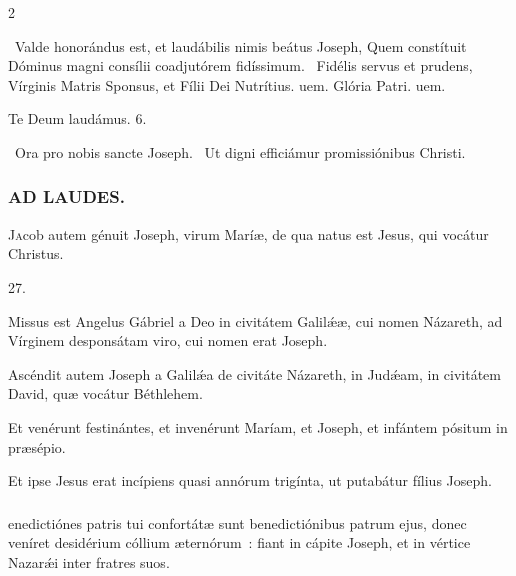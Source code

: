 \documentclass[9pt,twoside]{extarticle}
\begin{document}
\begin{multicols}{2}
{{{\begin{tightlist}{}
\item {}~Valde honorándus est, et laudábilis nimis beátus Joseph, \textred{*} Quem constítuit Dóminus magni consílii coadjutórem fidíssimum. ~Fidélis servus et prudens, Vírginis Matris Sponsus, et Fílii Dei Nutrítius. uem. Glória Patri. uem.
\item Te Deum laudámus. 6.
\item {}~Ora pro nobis sancte Joseph. ~Ut digni efficiámur promissiónibus Christi.
\end{tightlist}

\subsubsection*{\center \textsc{AD LAUDES.}}
\begin{center}\end{center}
\lettrine{J}acob autem génuit Joseph, virum Maríæ, de qua natus est Jesus, qui vocátur Christus.

\begin{tightlist}{}
\item {} 27.
\item {} Missus est Angelus Gábriel a Deo in civitátem Galilǽæ, cui nomen Názareth, ad Vírginem desponsátam viro, cui nomen erat Joseph.
\item {} Ascéndit autem Joseph a Galilǽa de civitáte Názareth, in Judǽam, in civitátem David, quæ vocátur Béthlehem.
\item {} Et venérunt festinántes, et invenérunt Maríam, et Joseph, et infántem pósitum in præsépio.
\item {} Et ipse Jesus erat incípiens quasi annórum trigínta, ut putabátur fílius Joseph.
\end{tightlist}

\subsubsection*{}
enedictiónes patris tui confortátæ sunt benedictiónibus patrum ejus, donec veníret desidérium cóllium æternórum~: fiant in cápite Joseph, et in vértice Nazarǽi inter fratres suos.

}}}
\end{multicols}
\end{document}
